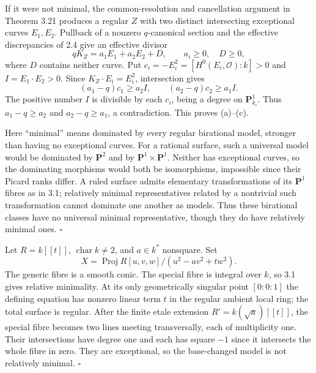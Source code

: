 \documentclass[11pt]{article}
\let\chapterexercise\exercise
\renewcommand{\exercise}[2]{\Needspace{8\baselineskip}\chapterexercise{#1}{#2}}
\begin{document}
\pf If it were not minimal, the common-resolution and cancellation argument in Theorem 3.21 produces a regular $Z$ with two distinct intersecting exceptional curves $E_1,E_2$. Pullback of a nonzero $q$-canonical section and the effective discrepancies of 2.4 give an effective divisor
\[ qK_Z=a_1E_1+a_2E_2+D,\qquad a_i\ge0,\quad D\ge0, \]
where $D$ contains neither curve. Put $c_i=-E_i^2=[H^0(E_i,\mathcal O):k]>0$ and $I=E_1\cdot E_2>0$. Since $K_Z\cdot E_i=E_i^2$, intersection gives
\[ (a_1-q)c_1\ge a_2 I,\qquad(a_2-q)c_2\ge a_1 I. \]
The positive number $I$ is divisible by each $c_i$, being a degree on $\mathbf P^1_{k_i}$. Thus $a_1-q\ge a_2$ and $a_2-q\ge a_1$, a contradiction. This proves (a)--(c).

Here ``minimal'' means dominated by every regular birational model, stronger than having no exceptional curves. For a rational surface, such a universal model would be dominated by $\mathbf P^2$ and by $\mathbf P^1\times\mathbf P^1$. Neither has exceptional curves, so the dominating morphisms would both be isomorphisms, impossible since their Picard ranks differ. A ruled surface admits elementary transformations of its $\mathbf P^1$ fibres as in 3.1; relatively minimal representatives related by a nontrivial such transformation cannot dominate one another as models. Thus these birational classes have no universal minimal representative, though they do have relatively minimal ones. \hfill$\square$

\pf Let $R=k[[t]]$, $\operatorname{char}k\ne2$, and $a\in k^*$ nonsquare. Set
\[ X=\operatorname{Proj}R[u,v,w]/(u^2-av^2+tw^2). \]
The generic fibre is a smooth conic. The special fibre is integral over $k$, so 3.1 gives relative minimality. At its only geometrically singular point $[0:0:1]$ the defining equation has nonzero linear term $t$ in the regular ambient local ring; the total surface is regular. After the finite etale extension $R'=k(\sqrt a)[[t]]$, the special fibre becomes two lines meeting transversally, each of multiplicity one. Their intersections have degree one and each has square $-1$ since it intersects the whole fibre in zero. They are exceptional, so the base-changed model is not relatively minimal. \hfill$\square$
\end{document}
